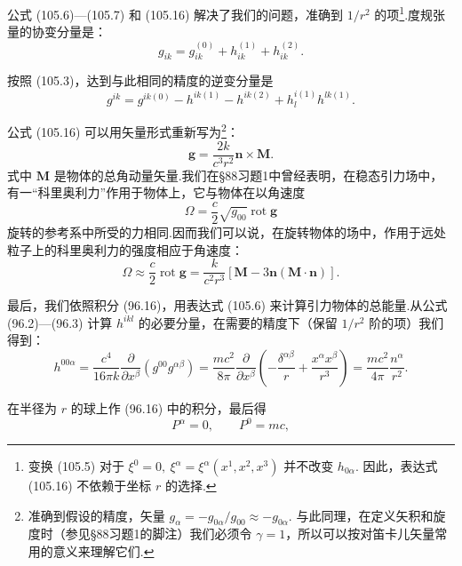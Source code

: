 公式 (105.6)—(105.7) 和 (105.16) 解决了我们的问题，准确到 $1/r^{2}$ 的项\footnote{变换 (105.5) 对于 $\xi^{0}=0,\ \xi^{\alpha}=\xi^{\alpha}(x^{1},x^{2},x^{3})$ 并不改变 $h_{0\alpha}$. 因此，表达式 (105.16) 不依赖于坐标 $r$ 的选择.}.度规张量的协变分量是：
\begin{equation}
  g_{ik}=g_{ik}^{(0)}+h_{ik}^{(1)}+h_{ik}^{(2)}.
\end{equation}

按照 (105.3)，达到与此相同的精度的逆变分量是
\begin{equation}
  g^{ik}=g^{ik(0)}-h^{ik(1)}-h^{ik(2)}
  +h_l^{i(1)}h^{lk(1)}.
\end{equation}

公式 (105.16) 可以用矢量形式重新写为\footnote{准确到假设的精度，矢量 $g_{\alpha}=-g_{0\alpha}/g_{00}\approx-g_{0\alpha}$. 与此同理，在定义矢积和旋度时（参见§88习题1的脚注）我们必须令 $\gamma=1$，所以可以按对笛卡儿矢量常用的意义来理解它们.}：
\begin{equation}
  \boldsymbol{g}=\frac{2k}{c^{3}r^{2}}\boldsymbol{n}\times\boldsymbol{M}.
\end{equation}
式中 $\boldsymbol{M}$ 是物体的总角动量矢量.我们在§88习题1中曾经表明，在稳态引力场中，有一“科里奥利力”作用于物体上，它与物体在以角速度
\begin{equation*}
  \Omega=\frac{c}{2}\sqrt{g_{00}}\operatorname{rot}\boldsymbol{g}
\end{equation*}
旋转的参考系中所受的力相同.因而我们可以说，在旋转物体的场中，作用于远处粒子上的科里奥利力的强度相应于角速度：
\begin{equation}
  \Omega\approx\frac{c}{2}\operatorname{rot}\boldsymbol{g}
  =\frac{k}{c^{2}r^{3}}\left[\boldsymbol{M}
  -3\boldsymbol{n}(\boldsymbol{M}\cdot\boldsymbol{n})\right].
\end{equation}

最后，我们依照积分 (96.16)，用表达式 (105.6) 来计算引力物体的总能量.从公式 (96.2)—(96.3) 计算 $h^{ikl}$ 的必要分量，在需要的精度下（保留 $1/r^{2}$ 阶的项）我们得到：
\begin{equation*}
  h^{00\alpha}
  =\frac{c^{4}}{16\pi k}\frac{\partial}{\partial x^{\beta}}
  (g^{00}g^{\alpha\beta})
  =\frac{mc^{2}}{8\pi}\frac{\partial}{\partial x^{\beta}}
  \left(-\frac{\delta^{\alpha\beta}}{r}
  +\frac{x^{\alpha}x^{\beta}}{r^{3}}\right)
  =\frac{mc^{2}}{4\pi}\frac{n^{\alpha}}{r^{2}}.
\end{equation*}

在半径为 $r$ 的球上作 (96.16) 中的积分，最后得
\begin{equation}
  P^{\alpha}=0,\qquad P^{0}=mc,
\end{equation}

